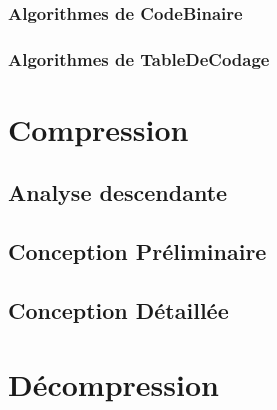 \documentclass[10pt]{report}
\begin{document}
            \subsection{Algorithmes de CodeBinaire}
                
            \subsection{Algorithmes de TableDeCodage}
                

    \chapter{Compression}

        \section{Analyse descendante}

        \newpage
        \section{Conception Préliminaire}
            
            
            
            
            
			
            
            

        \newpage
        \section{Conception Détaillée}
            
            
            
            
          	
			
            
            
    
    \chapter{Décompression}
\end{document}
